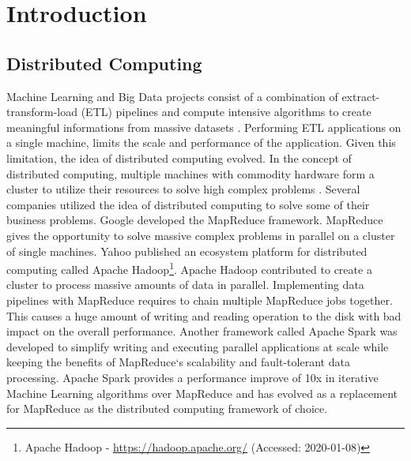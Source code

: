 \chapter{Introduction}
\label{sec:01_introduction}


\section{Distributed Computing}
Machine Learning and Big Data projects consist of a combination of extract-transform-load (ETL) pipelines and compute intensive algorithms to create meaningful informations from massive datasets \cite{Vadapalli2018DevOps}.
Performing ETL applications on a single machine, limits the scale and performance of the application. Given this limitation, the idea of distributed computing evolved. In the concept of distributed computing, multiple machines with commodity hardware form a cluster to utilize their resources to solve high complex problems \cite{Ganelin2016Spark}.
Several companies utilized the idea of distributed computing to solve some of their business problems. 
Google developed the MapReduce\cite{Dean2004MapReduce} framework. MapReduce gives the opportunity to solve massive complex problems in parallel on a cluster of single machines.
Yahoo published an ecosystem platform for distributed computing called Apache Hadoop\footnote{Apache Hadoop - \url{https://hadoop.apache.org/} (Accessed: 2020-01-08)}. Apache Hadoop contributed to create a cluster to process massive amounts of data in parallel.
Implementing data pipelines with MapReduce requires to chain multiple MapReduce jobs together. This causes a huge amount of writing and reading operation to the disk with bad impact on the overall performance. Another framework called Apache Spark was developed to simplify writing and executing parallel applications at scale while keeping the benefits of MapReduce`s scalability and fault-tolerant data processing. Apache Spark provides a performance improve of 10x in iterative Machine Learning algorithms over MapReduce \cite{Zaharia2010Spark} and has evolved as a replacement for MapReduce as the distributed computing framework of choice.


